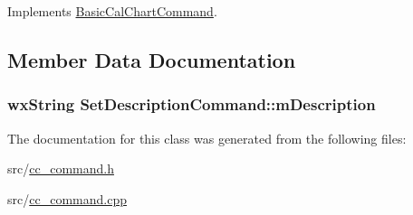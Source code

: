 Implements \hyperlink{a00018_ab6f65965601103020ea8276abf88313a}{Basic\-Cal\-Chart\-Command}.



\subsection{Member Data Documentation}
\hypertarget{a00125_a444f2db7c8e41b53b3a7327ab62c6445}{
\subsubsection[{m\-Description}]{\setlength{\rightskip}{0pt plus 5cm}wx\-String Set\-Description\-Command\-::m\-Description\hspace{0.3cm}{\ttfamily [protected]}}}\label{a00125_a444f2db7c8e41b53b3a7327ab62c6445}


The documentation for this class was generated from the following files\-:\begin{DoxyCompactItemize}
\item 
src/\hyperlink{a00183}{cc\-\_\-command.\-h}\item 
src/\hyperlink{a00182}{cc\-\_\-command.\-cpp}\end{DoxyCompactItemize}
